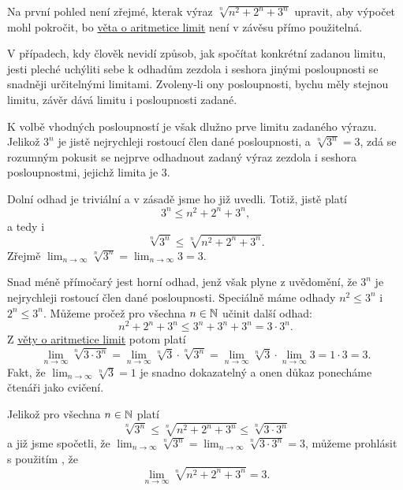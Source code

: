 \begin{probsol}
 Na první pohled není zřejmé, kterak výraz $\sqrt[n]{n^2 + 2^{n} + 3^{n}}$
 upravit, aby výpočet mohl pokročit, bo \hyperref[thm:aritmetika-limit]{věta o
 aritmetice limit} není v závěsu 
 přímo použitelná.

 V případech, kdy člověk nevidí způsob, jak spočítat konkrétní zadanou limitu,
 jesti pleché uchýliti sebe k odhadům zezdola i seshora jinými posloupnosti se
 snadněji určitelnými limitami. Zvoleny-li ony posloupnosti, bychu měly stejnou
 limitu, závěr  dává limitu i
 posloupnosti zadané.

 K volbě vhodných posloupností je však dlužno prve  limitu zadaného
 výrazu. Jelikož $3^{n}$ je jistě nejrychleji rostoucí člen dané posloupnosti, a
 $\sqrt[n]{3^{n}} = 3$, zdá se rozumným pokusit se nejprve odhadnout zadaný
 výraz zezdola i seshora posloupnostmi, jejichž limita je $3$.

 Dolní odhad je triviální a v zásadě jsme ho již uvedli. Totiž, jistě platí
 \[
  3^{n} \leq n^2 + 2^{n} + 3^{n},
 \]
 a tedy i
 \[
  \sqrt[n]{3^{n}} \leq \sqrt[n]{n^2 + 2^{n} + 3^{n}}.
 \]
 Zřejmě $\lim_{n \to \infty} \sqrt[n]{3^{n}} = \lim_{n \to \infty} 3 = 3$.

 Snad méně přímočarý jest horní odhad, jenž však plyne z uvědomění, že $3^{n}$
 je nejrychleji rostoucí člen dané posloupnosti. Speciálně máme odhady $n^2 \leq
 3^{n}$ i $2^{n} \leq 3^{n}$. Můžeme pročež pro všechna $n \in \mathbb{N}$ učinit další
 odhad:
 \[
  n^2 + 2^{n} + 3^{n} \leq 3^{n} + 3^{n} + 3^{n} = 3 \cdot 3^{n}.
 \]
 Z \hyperref[thm:aritmetika-limit]{věty o aritmetice limit} potom platí
 \[
  \lim_{n \to \infty} \sqrt[n]{3 \cdot 3^{n}} = \lim_{n \to \infty} \sqrt[n]{3}
  \cdot \sqrt[n]{3^{n}} = \lim_{n \to \infty} \sqrt[n]{3} \cdot \lim_{n \to
  \infty} 3 = 1 \cdot 3 = 3.
 \]
 Fakt, že $\lim_{n \to \infty} \sqrt[n]{3} = 1$ je snadno dokazatelný a onen
 důkaz ponecháme čtenáři jako cvičení.

 Jelikož pro všechna $n \in \mathbb{N}$ platí
 \[
  \sqrt[n]{3^{n}} \leq \sqrt[n]{n^2 + 2^{n} + 3^{n}} \leq \sqrt[n]{3 \cdot
  3^{n}}
 \]
 a již jsme spočetli, že $\lim_{n \to \infty} \sqrt[n]{3^{n}} = \lim_{n \to
 \infty} \sqrt[n]{3 \cdot 3^{n}} = 3$, můžeme prohlásit s použitím
 , že
 \[
  \lim_{n \to \infty} \sqrt[n]{n^2 + 2^{n} + 3^{n}} = 3.
 \]
\end{probsol}

